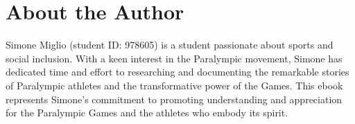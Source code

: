 \chapter*{About the Author} %
Simone Miglio (student ID: 978605) is a student passionate about sports and social inclusion. With a keen interest in the Paralympic movement, Simone has dedicated time and effort to researching and documenting the remarkable stories of Paralympic athletes and the transformative power of the Games. This ebook represents Simone's commitment to promoting understanding and appreciation for the Paralympic Games and the athletes who embody its spirit.

